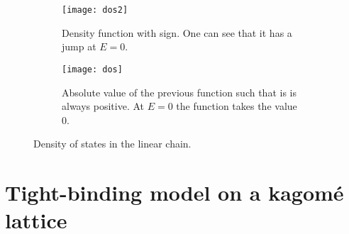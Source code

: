 \documentclass[11pt, english, fleqn, DIV=15, headinclude, BCOR=1cm]{scrartcl}
\begin{document}
\begin{figure}
    \begin{subfigure}[t]{0.47\linewidth}
        \centering
        \texttt{[image: dos2]}
        \caption{%
            Density function with sign. One can see that it has a jump at $E =
            0$.
        }
        \label{fig:dos/2}
    \end{subfigure}
    \hfill
    \begin{subfigure}[t]{0.47\linewidth}
        \centering
        \texttt{[image: dos]}
        \caption{%
            Absolute value of the previous function such that is is always
            positive. At $E = 0$ the function takes the value 0.
        }
        \label{fig:dos/1}
    \end{subfigure}
    \caption{%
        Density of states in the linear chain.
    }
    \label{fig:dos}
\end{figure}


\section{Tight-binding model on a kagomé lattice}
\label{homework:2}
\end{document}
